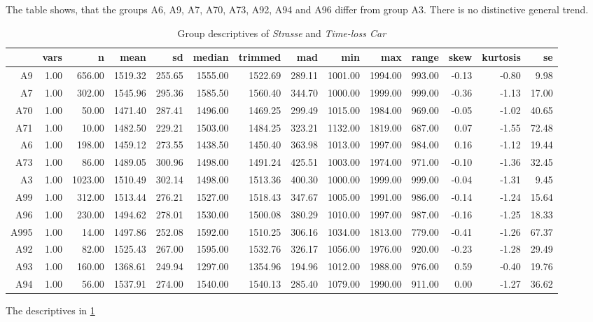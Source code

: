 The table shows, that the groups A6, A9, A7, A70, A73, A92, A94 and A96 differ from group A3. There is no distinctive general trend.
\begin{table}[ht!]
	\tiny
	\centering
  \begin{tabular}{rrrrrrrrrrrrrr}
    \hline
    & vars & n & mean & sd & median & trimmed & mad & min & max & range & skew & kurtosis & se \\ 
    \hline
    A9   & 1.00 & 656.00 & 1519.32 & 255.65 & 1555.00 & 1522.69 & 289.11 & 1001.00 & 1994.00 & 993.00 & -0.13 & -0.80 & 9.98 \\ 
    A7   & 1.00 & 302.00 & 1545.96 & 295.36 & 1585.50 & 1560.40 & 344.70 & 1000.00 & 1999.00 & 999.00 & -0.36 & -1.13 & 17.00 \\ 
    A70  & 1.00 & 50.00 & 1471.40 & 287.41 & 1496.00 & 1469.25 & 299.49 & 1015.00 & 1984.00 & 969.00 & -0.05 & -1.02 & 40.65 \\ 
    A71  & 1.00 & 10.00 & 1482.50 & 229.21 & 1503.00 & 1484.25 & 323.21 & 1132.00 & 1819.00 & 687.00 & 0.07 & -1.55 & 72.48 \\ 
    A6   & 1.00 & 198.00 & 1459.12 & 273.55 & 1438.50 & 1450.40 & 363.98 & 1013.00 & 1997.00 & 984.00 & 0.16 & -1.12 & 19.44 \\ 
    A73  & 1.00 & 86.00 & 1489.05 & 300.96 & 1498.00 & 1491.24 & 425.51 & 1003.00 & 1974.00 & 971.00 & -0.10 & -1.36 & 32.45 \\ 
    A3   & 1.00 & 1023.00 & 1510.49 & 302.14 & 1498.00 & 1513.36 & 400.30 & 1000.00 & 1999.00 & 999.00 & -0.04 & -1.31 & 9.45 \\ 
    A99  & 1.00 & 312.00 & 1513.44 & 276.21 & 1527.00 & 1518.43 & 347.67 & 1005.00 & 1991.00 & 986.00 & -0.14 & -1.24 & 15.64 \\ 
    A96  & 1.00 & 230.00 & 1494.62 & 278.01 & 1530.00 & 1500.08 & 380.29 & 1010.00 & 1997.00 & 987.00 & -0.16 & -1.25 & 18.33 \\ 
    A995 & 1.00 & 14.00 & 1497.86 & 252.08 & 1592.00 & 1510.25 & 306.16 & 1034.00 & 1813.00 & 779.00 & -0.41 & -1.26 & 67.37 \\ 
    A92  & 1.00 & 82.00 & 1525.43 & 267.00 & 1595.00 & 1532.76 & 326.17 & 1056.00 & 1976.00 & 920.00 & -0.23 & -1.28 & 29.49 \\ 
    A93  & 1.00 & 160.00 & 1368.61 & 249.94 & 1297.00 & 1354.96 & 194.96 & 1012.00 & 1988.00 & 976.00 & 0.59 & -0.40 & 19.76 \\ 
    A94  & 1.00 & 56.00 & 1537.91 & 274.00 & 1540.00 & 1540.13 & 285.40 & 1079.00 & 1990.00 & 911.00 & 0.00 & -1.27 & 36.62 \\ 
    \hline
  \end{tabular}
	\caption{Group descriptives of \textit{Strasse} and \textit{Time-loss Car}}
	\label{tbl:descriptives_arbis_matched_Strasse_TLCar}
\end{table}
The descriptives in \cref{tbl:descriptives_arbis_matched_Strasse_TLCar}

